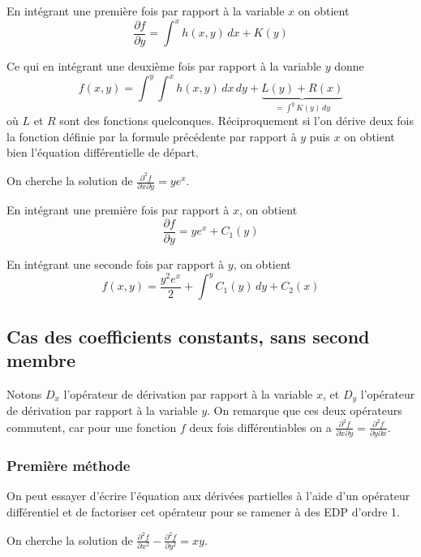 \documentclass[12pt]{article}
\newcounter{exercice}
\newcounter{remarque}
\begin{document}
En intégrant une première fois par rapport à la variable $x$ on obtient
$$
\frac{\partial f}{\partial y} = \int^{x} h(x, y)\, dx + K(y)
$$

Ce qui en intégrant une deuxième fois par rapport à la variable $y$ donne
$$
f(x, y) = \int^{y} \int^{x} h(x, y)\, dx\, dy + \underbrace{L(y) + R(x)}_{= \int^{y} K(y)\, dy}
$$
où $L$ et $R$ sont des fonctions quelconques. Réciproquement si l'on dérive deux fois la fonction définie par la formule précédente par rapport à $y$ puis $x$ on obtient bien l'équation différentielle de départ.

\begin{exercice}
On cherche la solution de $\frac{\partial^{2} f}{\partial x \partial y} = y e^{x}$.
\end{exercice}

\begin{corrige}
En intégrant une première fois par rapport à $x$, on obtient
$$
\frac{\partial f}{\partial y} = y e^{x} + C_{1}(y)
$$

En intégrant une seconde fois par rapport à $y$, on obtient
$$
f(x, y) = \frac{y^{2} e^{x}}{2} + \int^{y} C_{1}(y)\, dy + C_{2}(x)
$$
\end{corrige}

\subsection{Cas des coefficients constants, sans second membre}

Notons $D_{x}$ l'opérateur de dérivation par rapport à la variable $x$, et $D_{y}$ l'opérateur de dérivation par rapport à la variable $y$. On remarque que ces deux opérateurs commutent, car pour une fonction $f$ deux fois différentiables on a $\frac{\partial^{2} f}{\partial x \partial y} = \frac{\partial^{2} f}{\partial y \partial x}$.

\subsubsection{Première méthode}

On peut essayer d'écrire l'équation aux dérivées partielles à l'aide d'un opérateur différentiel et de factoriser cet opérateur pour se ramener à des EDP d'ordre 1.

\begin{exercice}
On cherche la solution de $\frac{\partial^{2} f}{\partial x^{2}} - \frac{\partial^{2} f}{\partial y^{2}} = xy$.
\end{exercice}
\end{document}
